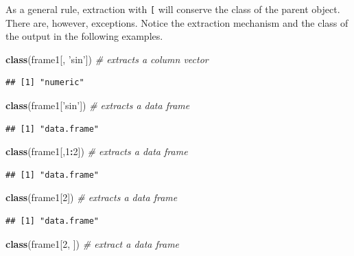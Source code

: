 \documentclass[]{book}
\newenvironment{Shaded}{\begin{snugshade}}{\end{snugshade}}
\newcommand{\CommentTok}[1]{\textcolor[rgb]{0.56,0.35,0.01}{\textit{#1}}}
\newcommand{\DecValTok}[1]{\textcolor[rgb]{0.00,0.00,0.81}{#1}}
\newcommand{\KeywordTok}[1]{\textcolor[rgb]{0.13,0.29,0.53}{\textbf{#1}}}
\newcommand{\NormalTok}[1]{#1}
\newcommand{\OperatorTok}[1]{\textcolor[rgb]{0.81,0.36,0.00}{\textbf{#1}}}
\newcommand{\StringTok}[1]{\textcolor[rgb]{0.31,0.60,0.02}{#1}}
\theoremstyle{definition}
\theoremstyle{definition}
\theoremstyle{definition}
\theoremstyle{remark}
\begin{document}
As a general rule, extraction with \texttt{{[}} will conserve the class of the parent object.
There are, however, exceptions.
Notice the extraction mechanism and the class of the output in the following examples.

\begin{Shaded}
\begin{Highlighting}[]
\KeywordTok{class}\NormalTok{(frame1[, }\StringTok{'sin'}\NormalTok{])  }\CommentTok{# extracts a column vector}
\end{Highlighting}
\end{Shaded}

\begin{verbatim}
## [1] "numeric"
\end{verbatim}

\begin{Shaded}
\begin{Highlighting}[]
\KeywordTok{class}\NormalTok{(frame1[}\StringTok{'sin'}\NormalTok{])  }\CommentTok{# extracts a data frame}
\end{Highlighting}
\end{Shaded}

\begin{verbatim}
## [1] "data.frame"
\end{verbatim}

\begin{Shaded}
\begin{Highlighting}[]
\KeywordTok{class}\NormalTok{(frame1[,}\DecValTok{1}\OperatorTok{:}\DecValTok{2}\NormalTok{])  }\CommentTok{# extracts a data frame}
\end{Highlighting}
\end{Shaded}

\begin{verbatim}
## [1] "data.frame"
\end{verbatim}

\begin{Shaded}
\begin{Highlighting}[]
\KeywordTok{class}\NormalTok{(frame1[}\DecValTok{2}\NormalTok{])  }\CommentTok{# extracts a data frame}
\end{Highlighting}
\end{Shaded}

\begin{verbatim}
## [1] "data.frame"
\end{verbatim}

\begin{Shaded}
\begin{Highlighting}[]
\KeywordTok{class}\NormalTok{(frame1[}\DecValTok{2}\NormalTok{, ])  }\CommentTok{# extract a data frame}
\end{Highlighting}
\end{Shaded}
\end{document}
